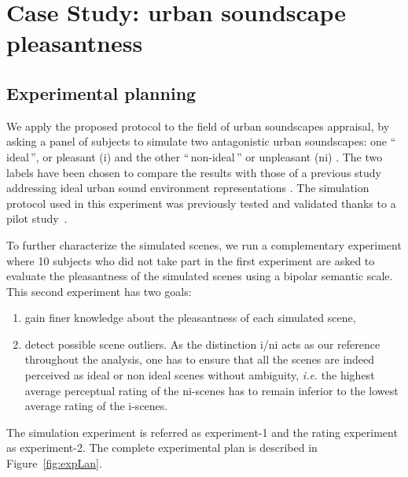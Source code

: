 \documentclass[twoside,twocolumn]{article}
\begin{document}
\section{Case Study: urban soundscape pleasantness}
\label{sec:CaseStudyUrbanSoundscape}
\subsection{Experimental planning}

We apply the proposed protocol to the field of urban soundscapes appraisal, by asking a panel of subjects to simulate two antagonistic urban soundscapes:  one ``\,ideal\,'', or pleasant (i) and the other ``\,non-ideal\,'' or unpleasant (ni) . The two labels have been chosen to compare the results with those of a previous study addressing ideal urban sound environment representations \cite{guastavino_ideal_2006}. The simulation protocol used in this experiment was previously tested and validated thanks to a pilot study~\cite{soundscape3}.


To further characterize the simulated scenes, we run a complementary experiment where 10 subjects who did not take part in the first experiment are asked to evaluate the pleasantness of the simulated scenes using a bipolar semantic scale. This second experiment has two goals:

\begin{enumerate}
\item gain finer knowledge about the pleasantness of each simulated scene, 
\item detect possible scene outliers. As the distinction i/ni   acts as our reference throughout the analysis, one has to ensure that all the scenes are indeed perceived as ideal or non ideal  scenes without ambiguity, \textit{i.e.} the highest average perceptual rating of the ni-scenes has to remain inferior to the lowest average rating of the i-scenes.
\end{enumerate}

The simulation experiment is referred as experiment-1 and the rating experiment as experiment-2. The complete experimental plan is described in Figure~\ref{fig:expLan}.  
\end{document}
